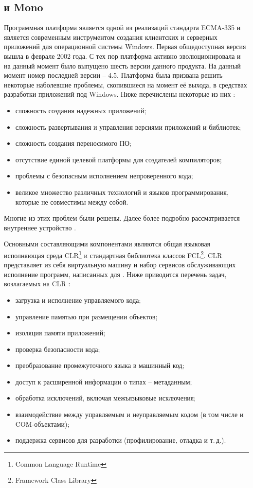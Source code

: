 \subsection{\DotNet и Mono}

Программная платформа \DotNet является одной из реализаций стандарта ECMA-335 \cite{ECMA335} и является современным инструментом создания клиентских и серверных приложений для операционной системы Windows. Первая общедоступная версия \DotNet вышла в феврале 2002 года. С тех пор платформа активно эволюционировала и на данный момент было выпущено шесть версии данного продукта. На данный момент номер последней версии \DotNet -- 4.5. Платформа \DotNet была призвана решить некоторые наболевшие проблемы, скопившиеся на момент её выхода, в средствах разработки приложений под Windows. Ниже перечислены некоторые из них \cite{Richter}:
\begin{itemize}
    \item сложность создания надежных приложений;
    \item сложность развертывания и управления версиями приложений и библиотек;
    \item сложность создания переносимого ПО;
    \item отсутствие единой целевой платформы для создателей компиляторов;
    \item проблемы с безопасным исполнением непроверенного кода;
    \item великое множество различных технологий и языков программирования, которые не совместимы между собой.
\end{itemize}

Многие из этих проблем были решены. Далее более подробно рассматривается внутреннее устройство \DotNet.

Основными составляющими компонентами \DotNet являются общая языковая исполняющая среда CLR\footnote{Common Language Runtime} и стандартная библиотека классов FCL\footnote{Framework Class Library}. CLR представляет из себя виртуальную машину и набор сервисов обслуживающих исполнение программ, написанных для \DotNet. Ниже приводится перечень задач, возлагаемых на CLR \cite{Marchenko}:
\begin{itemize}
    \item загрузка и исполнение управляемого кода;
    \item управление памятью при размещении объектов;
    \item изоляция памяти приложений;
    \item проверка безопасности кода;
    \item преобразование промежуточного языка в машинный код;
    \item доступ к расширенной информации о типах -- метаданным;
    \item обработка исключений, включая межъязыковые исключения;
    \item взаимодействие между управляемым и неуправляемым кодом (в том числе и COM-объектами);
    \item поддержка сервисов для разработки (профилирование, отладка и т.\,д.).
\end{itemize}

